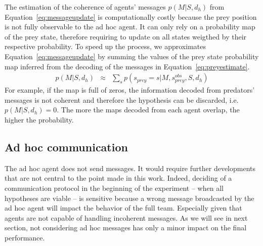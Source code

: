 The estimation of the coherence of agents' messages $p(M|S,d_h)$ from Equation~\ref{eq:messageupdate} is computationally costly because the prey position is not fully observable to the ad hoc agent. It can only rely on a probability map of the prey state, therefore requiring to update on all states weigthed by their respective probability.
To speed up the process, we approximates Equation~\ref{eq:messageupdate} by summing the values of the prey state probability map inferred from the decoding of the messages in Equation~\ref{eq:preyestimate}.
%
\begin{eqnarray}
p(M|S,d_h) &\approx& \sum_{s} p(s_{prey} = s|M, s^{obs}_{prey}, S, d_h)  \label{eq:approxmessupdate}
\end{eqnarray}
%
For example, if the map is full of zeros, the information decoded from predators' messages is not coherent and therefore the hypothesis can be discarded, i.e. $p(M|S,d_h) = 0$. The more the maps decoded from each agent overlap, the higher the probability.


\subsection{Ad hoc communication}

The ad hoc agent does not send messages. It would require further developments that are not central to the point made in this work. Indeed, deciding of a communication protocol in the beginning of the experiment -- when all hypotheses are viable -- is sensitive because a wrong message broadcasted by the ad hoc agent will impact the behavior of the full team. Especially given that agents are not capable of handling incoherent messages. As we will see in next section, not considering ad hoc messages has only a minor impact on the final performance.

